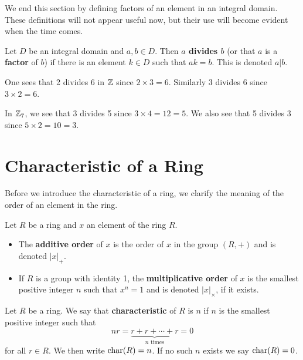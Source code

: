 \newpage

We end this section by defining factors of an element in an integral domain. These definitions will not appear useful now, but their use will become evident when the time comes.

\begin{definition}
    Let $D$ be an integral domain and $a,b \in D$. Then \textbf{$a$ divides $b$} (or that $a$ is a \textbf{factor} of $b$) if there is an element $k \in D$ such that $ak = b$. This is denoted $a \vert b$.
\end{definition}
\begin{example}
    One sees that 2 divides 6 in $\mathbb{Z}$ since $2 \times 3 = 6$. Similarly 3 divides 6 since $3 \times 2 = 6$.
\end{example}
\begin{example}
    In $\mathbb{Z}_7$, we see that 3 divides 5 since $3 \times 4 = 12 = 5$. We also see that 5 divides 3 since $5 \times 2 = 10 = 3$.
\end{example}

\section{Characteristic of a Ring}
Before we introduce the characteristic of a ring, we clarify the meaning of the order of an element in the ring.
\begin{definition}
    Let $R$ be a ring and $x$ an element of the ring $R$.
    \begin{itemize}
        \item The \textbf{additive order} of $x$ is the order of $x$ in the group $(R, +)$ and is denoted $|x|_+$.
        \item If $R$ is a group with identity 1, the \textbf{multiplicative order} of $x$ is the smallest positive integer $n$ such that $x^n = 1$ and is denoted $|x|_\times$, if it exists.
    \end{itemize}
\end{definition}

\begin{definition}
    Let $R$ be a ring. We say that \textbf{characteristic} of $R$ is $n$ if $n$ is the smallest positive integer such that
    \[
        nr = \underbrace{r+r+\cdots+r}_{n \text{ times}} = 0
    \]
    for all $r \in R$. We then write $\mathrm{char}(R) = n$. If no such $n$ exists we say $\mathrm{char}(R) = 0$.
\end{definition}

